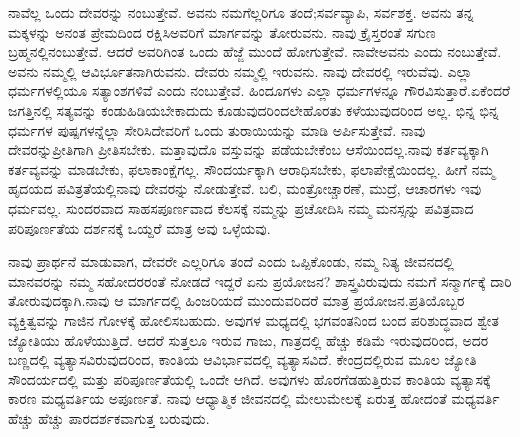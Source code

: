ನಾವೆಲ್ಲ ಒಂದು ದೇವರನ್ನು ನಂಬುತ್ತೇವೆ. ಅವನು ನಮಗೆಲ್ಲರಿಗೂ ತಂದೆ;\break ಸರ್ವವ್ಯಾಪಿ, ಸರ್ವಶಕ್ತ. ಅವನು ತನ್ನ ಮಕ್ಕಳನ್ನು ಅನಂತ ಪ್ರೇಮದಿಂದ ರಕ್ಷಿಸಿ\break ಅವರಿಗೆ ಮಾರ್ಗವನ್ನು ತೋರುವನು. ನಾವು ಕ್ರೈಸ್ತರಂತೆ ಸಗುಣ ಬ್ರಹ್ಮನಲ್ಲಿ\break ನಂಬುತ್ತೇವೆ. ಆದರೆ ಅವರಿಗಿಂತ ಒಂದು ಹೆಜ್ಜೆ ಮುಂದೆ ಹೋಗುತ್ತೇವೆ. ನಾವೇ\break ಅವನು ಎಂದು ನಂಬುತ್ತೇವೆ. ಅವನು ನಮ್ಮಲ್ಲಿ ಆವಿರ್ಭೂತನಾಗಿರುವನು. ದೇವರು ನಮ್ಮಲ್ಲಿ ಇರುವನು. ನಾವು ದೇವರಲ್ಲಿ ಇರುವೆವು. ಎಲ್ಲಾ ಧರ್ಮಗಳಲ್ಲಿಯೂ ಸತ್ಯಾಂಶಗಳಿವೆ ಎಂದು ನಂಬುತ್ತೇವೆ. ಹಿಂದೂಗಳು ಎಲ್ಲಾ ಧರ್ಮಗಳನ್ನೂ ಗೌರವಿಸುತ್ತಾರೆ.\break ಏಕೆಂದರೆ ಜಗತ್ತಿನಲ್ಲಿ ಸತ್ಯವನ್ನು ಕಂಡುಹಿಡಿಯಬೇಕಾದುದು ಕೂಡುವುದರಿಂದಲೇ\break ಹೊರತು ಕಳೆಯುವುದರಿಂದ ಅಲ್ಲ. ಭಿನ್ನ ಭಿನ್ನ ಧರ್ಮಗಳ ಪುಷ್ಪಗಳನ್ನೆಲ್ಲಾ ಸೇರಿಸಿ\break ದೇವರಿಗೆ ಒಂದು ತುರಾಯಿಯನ್ನು ಮಾಡಿ ಅರ್ಪಿಸುತ್ತೇವೆ. ನಾವು ದೇವರನ್ನು\break ಪ್ರೀತಿಗಾಗಿ ಪ್ರೀತಿಸಬೇಕು. ಮತ್ತಾವುದೊ ವಸ್ತುವನ್ನು ಪಡೆಯಬೇಕೆಂಬ ಆಸೆಯಿಂದಲ್ಲ.\break ನಾವು ಕರ್ತವ್ಯಕ್ಕಾಗಿ ಕರ್ತವ್ಯವನ್ನು ಮಾಡಬೇಕು, ಫಲಾಕಾಂಕ್ಷೆಗಲ್ಲ. ಸೌಂದರ್ಯಕ್ಕಾಗಿ ಆರಾಧಿಸಬೇಕು, ಫಲಾಪೇಕ್ಷೆಯಿಂದಲ್ಲ. ಹೀಗೆ ನಮ್ಮ ಹೃದಯದ ಪವಿತ್ರತೆಯಲ್ಲಿ\break ನಾವು ದೇವರನ್ನು ನೋಡುತ್ತೇವೆ. ಬಲಿ, ಮಂತ್ರೋಚ್ಚಾರಣೆ, ಮುದ್ರೆ, ಆಚಾರಗಳು ಇವು ಧರ್ಮವಲ್ಲ. ಸುಂದರವಾದ ಸಾಹಸಪೂರ್ಣವಾದ ಕೆಲಸಕ್ಕೆ ನಮ್ಮನ್ನು ಪ್ರಚೋದಿಸಿ ನಮ್ಮ ಮನಸ್ಸನ್ನು ಪವಿತ್ರವಾದ ಪರಿಪೂರ್ಣತೆಯ ದರ್ಶನಕ್ಕೆ ಒಯ್ದರೆ ಮಾತ್ರ ಅವು ಒಳ್ಳೆಯವು.

ನಾವು ಪ್ರಾರ್ಥನೆ ಮಾಡುವಾಗ, ದೇವರೇ ಎಲ್ಲರಿಗೂ ತಂದೆ ಎಂದು ಒಪ್ಪಿಕೊಂಡು, ನಮ್ಮ ನಿತ್ಯ ಜೀವನದಲ್ಲಿ ಮಾನವರನ್ನು ನಮ್ಮ ಸಹೋದರರಂತೆ ನೋಡದೆ ಇದ್ದರೆ ಏನು ಪ್ರಯೋಜನ? ಶಾಸ್ತ್ರವಿರುವುದು ನಮಗೆ ಸನ್ಮಾರ್ಗಕ್ಕೆ ದಾರಿ ತೋರುವುದಕ್ಕಾಗಿ.\break ನಾವು ಆ ಮಾರ್ಗದಲ್ಲಿ ಹಿಂಜರಿಯದೆ ಮುಂದುವರಿದರೆ ಮಾತ್ರ ಪ್ರಯೋಜನ.\break ಪ್ರತಿಯೊಬ್ಬರ ವ್ಯಕ್ತಿತ್ವವನ್ನು ಗಾಜಿನ ಗೋಳಕ್ಕೆ ಹೋಲಿಸಬಹುದು. ಅವುಗಳ ಮಧ್ಯದಲ್ಲಿ ಭಗವಂತನಿಂದ ಬಂದ ಪರಿಶುದ್ಧವಾದ ಶ್ವೇತ ಜ್ಯೋತಿಯು ಹೊಳೆಯುತ್ತಿದೆ. ಆದರೆ ಸುತ್ತಲೂ ಇರುವ ಗಾಜು, ಗಾತ್ರದಲ್ಲಿ ಹೆಚ್ಚು ಕಡಿಮೆ ಇರುವುದರಿಂದ, ಅದರ ಬಣ್ಣದಲ್ಲಿ ವ್ಯತ್ಯಾಸವಿರುವುದರಿಂದ, ಕಾಂತಿಯ ಆವಿರ್ಭಾವದಲ್ಲಿ ವ್ಯತ್ಯಾಸವಿದೆ. ಕೇಂದ್ರದಲ್ಲಿರುವ ಮೂಲ ಜ್ಯೋತಿ ಸೌಂದರ್ಯದಲ್ಲಿ ಮತ್ತು ಪರಿಪೂರ್ಣತೆಯಲ್ಲಿ ಒಂದೇ ಆಗಿದೆ. ಅವುಗಳು ಹೊರಗೆಡಹುತ್ತಿರುವ ಕಾಂತಿಯ ವ್ಯತ್ಯಾಸಕ್ಕೆ ಕಾರಣ ಮಧ್ಯವರ್ತಿಯ ಅಪೂರ್ಣತೆ. ನಾವು ಆಧ್ಯಾತ್ಮಿಕ ಜೀವನದಲ್ಲಿ ಮೇಲುಮೇಲಕ್ಕೆ ಏರುತ್ತ ಹೋದಂತೆ ಮಧ್ಯವರ್ತಿ ಹೆಚ್ಚು ಹೆಚ್ಚು ಪಾರದರ್ಶಕವಾಗುತ್ತ ಬರುವುದು.

